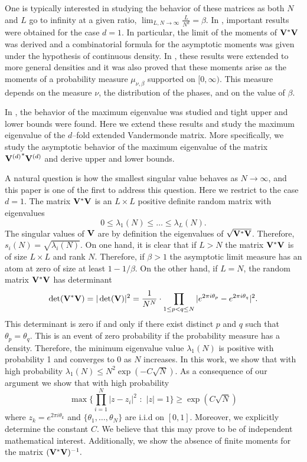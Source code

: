 \documentclass[smallextended]{svjour3}
\begin{document}
\par One is typically interested in studying the behavior of these matrices as both $N$ and $L$ go to infinity at a given ratio, $\lim_{L,N\to\infty}\frac{L}{N^{d}}=\beta$. In \cite{GC02}, important results were obtained for the case $d=1$. In particular, the limit of the moments of ${\bf V^{*}}{\bf V}$ was derived and a combinatorial formula for the asymptotic moments was given under the hypothesis of continuous density. In \cite{TW}, these results were extended to more general densities and it was also proved that these moments arise as the moments of a probability measure $\mu_{\nu,\beta}$ supported on $[0,\infty)$. This measure depends on the measure $\nu$, the distribution of the phases, and on the value of $\beta$.

\par In \cite{TW}, the behavior of the maximum eigenvalue was studied and tight upper and lower bounds were found. Here we extend these results and study the maximum eigenvalue of the $d$--fold extended Vandermonde matrix. More specifically, we study the asymptotic behavior of the maximum eigenvalue of the matrix ${{\bf V}^{(d)}}^{*}{\bf V}^{(d)}$ and derive upper and lower bounds.

\par A natural question is how the smallest singular value behaves as $N\to\infty$, and this paper is one of the first to address this question. Here we restrict to the case $d=1$. The matrix $\bf{V}^{*}\bf{V}$ is an $L\times L$ positive definite random matrix with eigenvalues 
$$
0\leq \lambda_{1}(N)\leq \ldots \leq \lambda_{L}(N).
$$
The singular values of $\bf{V}$ are by definition the eigenvalues of $\sqrt{\bf{V}^{*}\bf{V}}$. Therefore, $s_{i}(N)=\sqrt{\lambda_i(N)}$. On one hand, it is clear that if $L>N$ the matrix ${\bf V^{*}}{\bf V}$ is of size $L\times L$ and rank $N$. Therefore, if $\beta>1$ the asymptotic limit measure has an atom at zero of size at least $1-1/\beta$. On the other hand, if $L=N$, the random matrix ${\bf V^{*}}{\bf V}$ has determinant
\begin{equation}
\det({\bf V^{*}}{\bf V)}=|\det({\bf V})|^{2}=\frac{1}{N^{N}}\cdot\prod_{1\leq p<q\leq N}{|e^{2\pi i\theta_{p}}-e^{2\pi i\theta_{q}}|^2}.
\end{equation}
This determinant is zero if and only if there exist distinct $p$ and $q$ such that  $\theta_{p}=\theta_{q}$. This is an event of zero probability if the probability measure has a density. Therefore, the minimum eigenvalue value $\lambda_1(N)$ is positive with probability 1 and converges to 0 as $N$ increases. In this work, we show that with high probability $\lambda_{1}(N)\leq N^2\exp(-C\sqrt{N})$. As a consequence of our argument we show that with high probability 
\begin{equation}
\max \Bigg\{\prod_{i=1}^{N}|z-z_i|^2 \,\,:\,\,|z|=1\Bigg\}\geq \exp(C\sqrt{N})
\end{equation}
where $z_k=e^{2\pi i\theta_k}$ and $\{\theta_{1},\ldots,\theta_{N}\}$ are i.i.d on $[0,1]$. Moreover, we explicitly determine the constant $C$. We believe that this may prove to be of independent mathematical interest. Additionally, we show the absence of finite moments for the matrix $({\bf V^{*}}{\bf V})^{-1}.$
\end{document}
